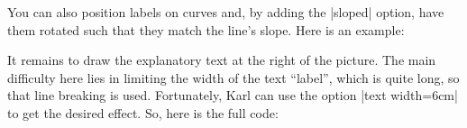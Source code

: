You can also position labels on curves and, by adding the |sloped| option, have
them rotated such that they match the line's slope. Here is an example:
%
\begin{codeexample}[]
\end{codeexample}

It remains to draw the explanatory text at the right of the picture. The main
difficulty here lies in limiting the width of the text ``label'', which is
quite long, so that line breaking is used. Fortunately, Karl can use the option
|text width=6cm| to get the desired effect. So, here is the full code:
%
